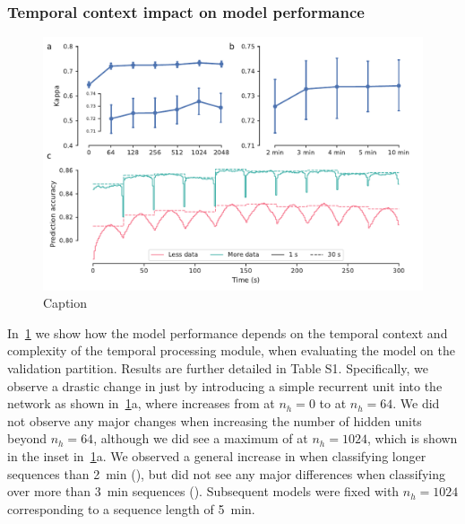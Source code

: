 \subsubsection{Temporal context impact on model performance}
\begin{figure}
    \centering
    \includegraphics[width=\columnwidth]{figures/paper-ii/figure_02_a-c.pdf}
    \caption[MASSCv2 temporal context]{Caption}
    \label{fig:paper-ii-figure2}
\end{figure}
In~\cref{fig:paper-ii-figure2} we show how the model performance depends on the temporal context and complexity of the temporal processing module, when evaluating the model on the validation partition.
Results are further detailed in Table S1.
Specifically, we observe a drastic change in \cohen just by introducing a simple recurrent unit into the network as shown in~\cref{fig:paper-ii-figure2}a, where \cohen increases from  at $n_h=0$ to  at $n_h=64$. 
We did not observe any major changes when increasing the number of hidden units beyond $n_h=64$, although we did see a maximum \cohen of  at $n_h=1024$, which is shown in the inset in~\cref{fig:paper-ii-figure2}a. 
We observed a general increase in \cohen when classifying longer sequences than \SI{2}{\minute} (), but did not see any major differences when classifying over more than \SI{3}{\minute} sequences ().
Subsequent models were fixed with $n_h=1024$ corresponding to a sequence length of \SI{5}{\minute}.


